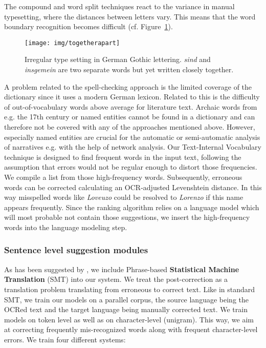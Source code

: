 \documentclass[11pt,letterpaper]{article}
\begin{document}
\noindent
The compound and word split techniques react to the variance in manual typesetting, where the distances between letters vary. This means that the word boundary recognition becomes difficult (cf. Figure~\ref{togetherapart}). 
\begin{figure}
\setlength{\belowcaptionskip}{-10pt}
\texttt{[image: img/togetherapart]}
\caption{Irregular type setting in German Gothic lettering. \textit{sind} and \textit{insgemein} are two separate words but yet written closely together.}
\label{togetherapart}
\end{figure}

\noindent
A problem related to the spell-checking approach is the limited coverage of the dictionary since it uses a modern German lexicon. Related to this is the difficulty of out-of-vocabulary words above average for literature text. Archaic words from e.g. the 17th century or named entities cannot be found in a dictionary and can therefore not be covered with any of the approaches mentioned above. However, especially named entities are crucial for the automatic or semi-automatic analysis of narratives e.g. with the help of network analysis. Our Text-Internal Vocabulary technique is designed to find frequent words in the input text, following the assumption that errors would not be regular enough to distort those frequencies. We compile a list from those high-frequency words. Subsequently, erroneous words can be corrected calculating an OCR-adjusted Levenshtein distance. In this way misspelled words like \textit{Loveuzo} could be resolved to \textit{Lorenzo} if this name appears frequently. Since the ranking algorithm relies on a language model which will most probable not contain those suggestions, we insert the high-frequency words into the language modeling step.  



\subsubsection{Sentence level suggestion modules}

As has been suggested by , we include Phrase-based \textbf{Statistical Machine Translation} (SMT) into our system. We treat the post-correction as a translation problem translating from erroneous to correct text. Like in standard SMT, we train our models on a parallel corpus, the source language being the OCRed text and the target language being manually corrected text. We train models on token level as well as on character-level (unigram). This way, we aim at correcting frequently mis-recognized words along with frequent character-level errors. We train four different systems:
\end{document}
